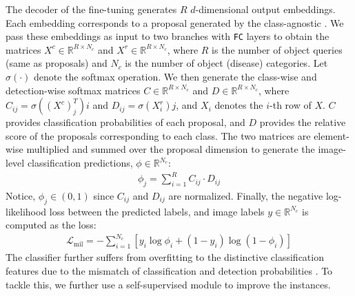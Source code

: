 %
The decoder of the fine-tuning \detr generates $R$ $d$-dimensional output embeddings. Each embedding corresponds to a proposal generated by the class-agnostic \detr. We pass these embeddings as input to two branches with \texttt{FC} layers to obtain the matrices $X^c \in \mathbb{R}^{R\times N_c}$ and $X^r \in \mathbb{R}^{R\times N_c}$, where $R$ is the number of object queries (same as proposals) and $N_c$ is the number of object (disease) categories. Let $\sigma(\cdot)$ denote the softmax operation. 
We then generate the class-wise and detection-wise softmax matrices $C\in\mathbb{R}^{R\times N_c}$ and $D\in\mathbb{R}^{R\times N_c}$, where $C_{ij} = \sigma((X^c)^T_j)i$ and $D_{ij} = \sigma(X^r_i)j$, and $X_i$ denotes the $i$-th row of $X$. $C$ provides classification probabilities of each proposal, and $D$ provides the relative score of the proposals corresponding to each class. The two matrices are element-wise multiplied and summed over the proposal dimension to generate the image-level classification predictions, $\phi\in\mathbb{R}^{N_c}$: 
\begin{align}
\phi_j = \sum_{i=1}^R C_{ij}\cdot D_{ij}
\end{align}
%
Notice, $\phi_j \in (0,1)$ since $C_{ij}$ and $D_{ij}$ are normalized. Finally, the negative log-likelihood loss between the predicted labels, and image labels $y\in\mathbb{R}^{N_c}$ is computed as the \mil loss:
%
\begin{align}
\mathcal{L}_\text{mil} = -\sum_{i=1}^{N_c}[{y_i \log{\phi_i}} + (1-y_i) \log{(1-\phi_i)}]   
\end{align}
The \mil classifier further suffers from overfitting to the distinctive classification features due to the mismatch of classification and detection probabilities \cite{oicr}. To tackle this, we further use a self-supervised module to improve the instances.

